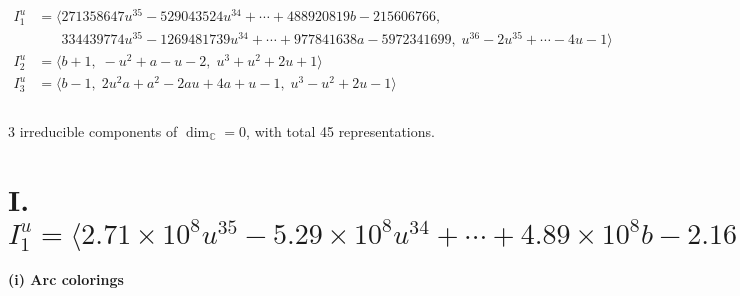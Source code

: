 \documentclass[1p]{elsarticle_modified}
\theoremstyle{definition}
\begin{document}
\begin{align*}
I^u_{1}&=\langle 
271358647 u^{35}-529043524 u^{34}+\cdots+488920819 b-215606766,\\
\phantom{I^u_{1}}&\phantom{= \langle  }334439774 u^{35}-1269481739 u^{34}+\cdots+977841638 a-5972341699,\;u^{36}-2 u^{35}+\cdots-4 u-1\rangle \\
I^u_{2}&=\langle 
b+1,\;- u^2+a- u-2,\;u^3+u^2+2 u+1\rangle \\
I^u_{3}&=\langle 
b-1,\;2 u^2 a+a^2-2 a u+4 a+u-1,\;u^3- u^2+2 u-1\rangle \\
\\
\end{align*}
\raggedright * 3 irreducible components of $\dim_{\mathbb{C}}=0$, with total 45 representations.\\
\newpage
\renewcommand{\arraystretch}{1}
\centering \section*{I. $I^u_{1}= \langle 2.71\times10^{8} u^{35}-5.29\times10^{8} u^{34}+\cdots+4.89\times10^{8} b-2.16\times10^{8},\;3.34\times10^{8} u^{35}-1.27\times10^{9} u^{34}+\cdots+9.78\times10^{8} a-5.97\times10^{9},\;u^{36}-2 u^{35}+\cdots-4 u-1 \rangle$}
\flushleft \textbf{(i) Arc colorings}\\
\end{document}
